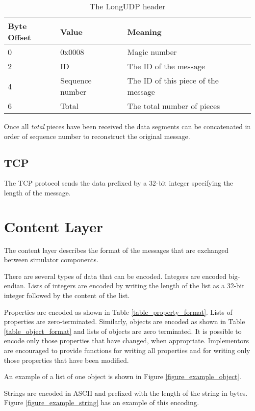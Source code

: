 \begin{table}[p]
\center
\begin{tabular}{|l|l|l|}
\hline
Byte Offset & Value & Meaning\\
\hline
0 & 0x0008 & Magic number\\
2 & ID & The ID of the message\\
4 & Sequence number & The ID of this piece of the message\\
6 & Total & The total number of pieces\\
\hline
\end{tabular}
\caption{The LongUDP header}
\label{table_longudp_header}
\end{table}

Once all \textit{total} pieces have been received the data segments can be concatenated in order of sequence number to reconstruct the original message.

\subsection{TCP}
The TCP protocol sends the data prefixed by a 32-bit integer specifying the length of the message.

\section{Content Layer}
The content layer describes the format of the messages that are exchanged between simulator components.

There are several types of data that can be encoded. Integers are encoded big-endian. Lists of integers are encoded by writing the length of the list as a 32-bit integer followed by the content of the list.

Properties are encoded as shown in Table \ref{table_property_format}. Lists of properties are zero-terminated. Similarly, objects are encoded as shown in Table \ref{table_object_format} and lists of objects are zero terminated. It is possible to encode only those properties that have changed, when appropriate. Implementors are encouraged to provide functions for writing all properties and for writing only those properties that have been modified.

An example of a list of one object is shown in Figure \ref{figure_example_object}.

Strings are encoded in ASCII and prefixed with the length of the string in bytes. Figure \ref{figure_example_string} has an example of this encoding.

